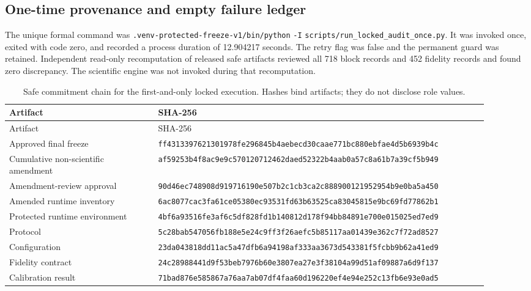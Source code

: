 \FloatBarrier
\subsection{One-time provenance and empty failure ledger}

The unique formal command was
\nolinkurl{.venv-protected-freeze-v1/bin/python} \texttt{-I}
\nolinkurl{scripts/run_locked_audit_once.py}.
It was invoked once, exited with code zero, and recorded a process duration of 12.904217 seconds.
The retry flag was false and the permanent guard was retained. Independent read-only recomputation
of released safe artifacts reviewed all 718 block records and 452 fidelity records and found zero discrepancy.
The scientific engine was not invoked during that recomputation.

\begingroup
\scriptsize
\begin{longtable}{p{0.29\linewidth}p{0.62\linewidth}}
\caption{Safe commitment chain for the first-and-only locked execution. Hashes bind artifacts;
they do not disclose role values.}\label{tab:locked-provenance}\\
\toprule
Artifact & SHA-256\\
\midrule
\endfirsthead
\toprule
Artifact & SHA-256\\
\midrule
\endhead
Approved final freeze & \nolinkurl{ff4313397621301978fe296845b4aebecd30caae771bc880ebfae4d5b6939b4c}\\
Cumulative non-scientific amendment & \nolinkurl{af59253b4f8ac9e9c570120712462daed52322b4aab0a57c8a61b7a39cf5b949}\\
Amendment-review approval & \nolinkurl{90d46ec748908d919716190e507b2c1cb3ca2c888900121952954b9e0ba5a450}\\
Amended runtime inventory & \nolinkurl{6ac8077cac3fa61ce05380ec93531fd63b63525ca83045815e9bc69fd77862b1}\\
Protected runtime environment & \nolinkurl{4bf6a93516fe3af6c5df828fd1b140812d178f94bb84891e700e015025ed7ed9}\\
Protocol & \nolinkurl{5c28bab547056fb188e5e24c9ff3f26aefc5b85117aa01439e362c7f72ad8527}\\
Configuration & \nolinkurl{23da043818dd11ac5a47dfb6a94198af333aa3673d543381f5fcbb9b62a41ed9}\\
Fidelity contract & \nolinkurl{24c28988441d9f53beb7976b60e3807ea27e3f38104a99d51af09887a6d9f137}\\
Calibration result & \nolinkurl{71bad876e585867a76aa7ab07df4faa60d196220ef4e94e252c13fb6e93e0ad5}\\

\end{longtable}

